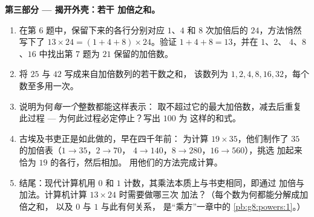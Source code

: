 \begin{problem}
\medskip
\noindent\textbf{第三部分 --- 揭开外壳：若干
加倍之和。}
\begin{enumerate}[resume]
  \item 在第 6 题中，保留下来的各行分别对应 $1$、$4$
        和 $8$ 次加倍后的 $24$，方法悄然写下了
        $13 \times 24 = (1 + 4 + 8) \times 24$。验证
        $1 + 4 + 8 = 13$，并在 $1$、$2$、
        $4$、$8$、$16$ 中找出第 7 题为 $21$ 保留的加倍数。
  \item 将 $25$ 与 $42$ 写成来自加倍数列的若干数之和，
        该数列为 $1, 2, 4, 8, 16, 32$，每个数至多用一次。
  \item 说明为何\emph{每一个}整数都能这样表示：
        取不超过它的最大加倍数，减去后重复此过程 ---
        为何此过程必定停止？写出 $100$ 为
        这样的和式。
  \item 古埃及书吏正是如此做的，早在四千年前：
        为计算 $19 \times 35$，他们制作了
        $35$ 的加倍表（$1 \to 35$，$2 \to 70$，
        $4 \to 140$，$8 \to 280$，$16 \to 560$），挑选
        加起来恰为 $19$ 的各行，然后相加。
        用他们的方法完成计算。
  \item 结尾：现代计算机用 $0$ 和
        $1$ 计数，其乘法本质上与书吏相同，即通过
        加倍与加法。计算机计算 $13 \times 24$ 时需要做哪三次
        加法？（每个数为何都能分解成加倍之和，
        以及 $0$ 与 $1$ 与此有何关系，
        是“乘方”一章中的
        \cref{pb:g8:powers:1}。）
\end{enumerate}
\end{problem}
